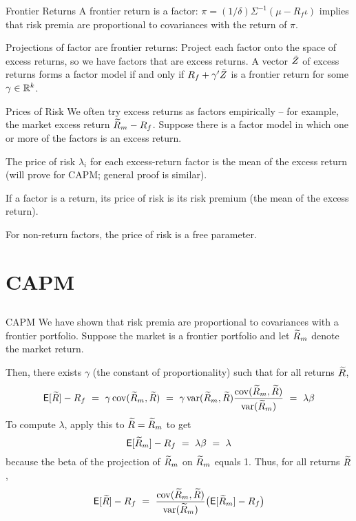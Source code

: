 \begin{frame}{Frontier Returns}
A frontier return is a factor: $\pi = (1/\delta)\Sigma^{-1}(\mu - R_f\iota)$ implies that risk premia are proportional to covariances with the return of $\pi$.

Projections of factor are frontier returns: Project each factor onto the space of excess returns, so we have factors  that are excess returns.  A vector $\tilde{Z}$ of excess returns forms a factor model if and only if $R_f + \gamma'\tilde{Z}$ is a frontier return for some $\gamma \in \mathbb{R}^k$.  
\end{frame}

\begin{frame}{Prices of Risk}
We often try excess returns as factors empirically -- for example, the market excess return $\widetilde{R}_m - R_f$.  Suppose there is a factor model in which one or more of the factors is an excess return.

The price of risk $\lambda_i$ for each excess-return factor is the mean of the excess return (will prove for CAPM; general proof is similar).

If a factor is a return, its price of risk is its risk premium (the mean of the excess return).

For non-return factors, the price of risk is a free parameter.
\end{frame}

\section{CAPM}\subsection{}

\begin{frame}{CAPM}
We have shown that risk premia are proportional to covariances with a frontier portfolio.  Suppose the market is a frontier portfolio and let $\widetilde{R}_m$ denote the market return.  

Then, there exists $\gamma$ (the constant of proportionality) such that for all returns $\widetilde{R}$,
$$\mathsf{E}[\widetilde{R}] - R_f \ = \ \gamma \operatorname{cov}(\widetilde{R}_m,\widetilde{R}) \ = \ \gamma \operatorname{var}(\widetilde{R}_m,\widetilde{R})\frac{\operatorname{cov}(\widetilde{R}_m,\widetilde{R})}{\operatorname{var}(\widetilde{R}_m)} \ = \ \lambda \beta$$
To compute $\lambda$, apply this to $\widetilde{R}=\widetilde{R}_m$ to get
$$\mye[\tr_m]-R_f \ = \ \lambda \beta \ = \ \lambda$$
because the beta of the projection of $\widetilde{R}_m$ on $\widetilde{R}_m$ equals 1.  Thus, for all returns $\widetilde{R}$,
$$\mathsf{E}[\widetilde{R}] - R_f \ = \ \frac{\operatorname{cov}(\widetilde{R}_m,\widetilde{R})}{\operatorname{var}(\widetilde{R}_m)}\big(\mathsf{E}[\widetilde{R}_m] - R_f \big)$$ 
\end{frame}

